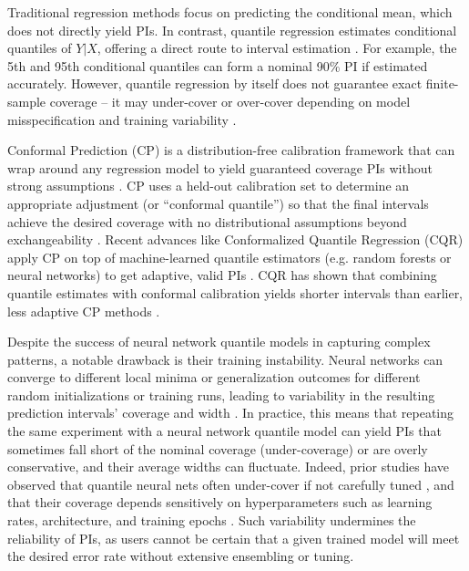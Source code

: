 \documentclass{article}
\begin{document}
Traditional regression methods focus on predicting the conditional mean, which does not directly yield PIs. In contrast, quantile regression estimates conditional quantiles of $Y|X$, offering a direct route to interval estimation \citep{Koenker2005}. For example, the 5th and 95th conditional quantiles can form a nominal 90\% PI if estimated accurately. However, quantile regression by itself does not guarantee exact finite-sample coverage -- it may under-cover or over-cover depending on model misspecification and training variability \citep{Park2022UnderstandingUB}.

Conformal Prediction (CP) is a distribution-free calibration framework that can wrap around any regression model to yield guaranteed coverage PIs without strong assumptions \citep{Shafer2008TutorialOC, Vovk2005AlgorithmicLI}. CP uses a held-out calibration set to determine an appropriate adjustment (or ``conformal quantile'') so that the final intervals achieve the desired coverage with no distributional assumptions beyond exchangeability \citep{Shafer2008TutorialOC, Vovk2005AlgorithmicLI}. Recent advances like Conformalized Quantile Regression (CQR) \citep{Romano2019ConformalizedQR} apply CP on top of machine-learned quantile estimators (e.g. random forests or neural networks) to get adaptive, valid PIs \citep{Romano2019ConformalizedQR}. CQR has shown that combining quantile estimates with conformal calibration yields shorter intervals than earlier, less adaptive CP methods \citep{Romano2019ConformalizedQR}.

Despite the success of neural network quantile models in capturing complex patterns, a notable drawback is their training instability. Neural networks can converge to different local minima or generalization outcomes for different random initializations or training runs, leading to variability in the resulting prediction intervals' coverage and width \citep{Xu2020UnderTH, Park2022UnderstandingUB}. In practice, this means that repeating the same experiment with a neural network quantile model can yield PIs that sometimes fall short of the nominal coverage (under-coverage) or are overly conservative, and their average widths can fluctuate. Indeed, prior studies have observed that quantile neural nets often under-cover if not carefully tuned \citep{Romano2019ConformalizedQR, Park2022UnderstandingUB}, and that their coverage depends sensitively on hyperparameters such as learning rates, architecture, and training epochs \citep{Xu2020UnderTH}. Such variability undermines the reliability of PIs, as users cannot be certain that a given trained model will meet the desired error rate without extensive ensembling or tuning.
\end{document}
